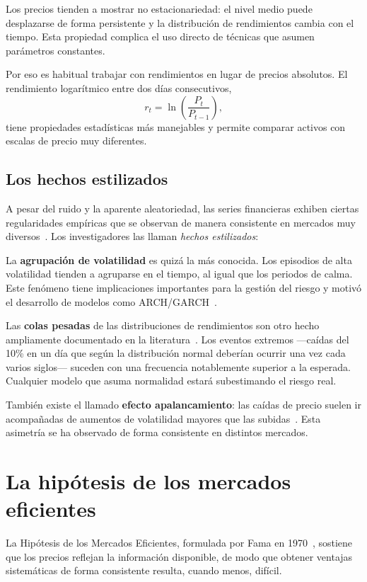 Los precios tienden a mostrar no estacionariedad: el nivel medio puede desplazarse de forma persistente y la distribución de rendimientos cambia con el tiempo. Esta propiedad complica el uso directo de técnicas que asumen parámetros constantes.

Por eso es habitual trabajar con rendimientos en lugar de precios absolutos. El rendimiento logarítmico entre dos días consecutivos,
\[
r_t = \ln\left(\frac{P_t}{P_{t-1}}\right),
\]
tiene propiedades estadísticas más manejables y permite comparar activos con escalas de precio muy diferentes.

\subsection{Los hechos estilizados}

A pesar del ruido y la aparente aleatoriedad, las series financieras exhiben ciertas regularidades empíricas que se observan de manera consistente en mercados muy diversos~\cite{cont2001empirical}. Los investigadores las llaman \emph{hechos estilizados}:

La \textbf{agrupación de volatilidad} es quizá la más conocida. Los episodios de alta volatilidad tienden a agruparse en el tiempo, al igual que los periodos de calma. Este fenómeno tiene implicaciones importantes para la gestión del riesgo y motivó el desarrollo de modelos como ARCH/GARCH~\cite{engle1982autoregressive, bollerslev1986generalized}.

Las \textbf{colas pesadas} de las distribuciones de rendimientos son otro hecho ampliamente documentado en la literatura~\cite{mandelbrot1963variation, cont2001empirical}. Los eventos extremos ---caídas del 10\% en un día que según la distribución normal deberían ocurrir una vez cada varios siglos--- suceden con una frecuencia notablemente superior a la esperada. Cualquier modelo que asuma normalidad estará subestimando el riesgo real.

También existe el llamado \textbf{efecto apalancamiento}: las caídas de precio suelen ir acompañadas de aumentos de volatilidad mayores que las subidas~\cite{cont2001empirical}. Esta asimetría se ha observado de forma consistente en distintos mercados.

\section{La hipótesis de los mercados eficientes}

La Hipótesis de los Mercados Eficientes, formulada por Fama en 1970~\cite{fama1970efficient}, sostiene que los precios reflejan la información disponible, de modo que obtener ventajas sistemáticas de forma consistente resulta, cuando menos, difícil.

